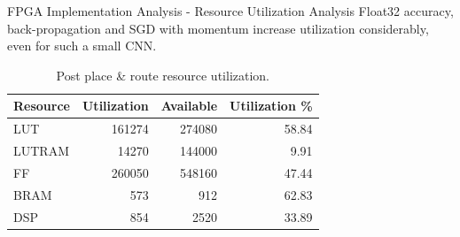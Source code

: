 \begin{frame}{FPGA Implementation Analysis - Resource Utilization Analysis}
    Float32 accuracy, back-propagation and SGD with momentum increase utilization considerably, even for such a small CNN.
    \begin{table}[H]
        \center
        \begin{tabular}
            { | l | r | r | r | }
            \hline
            Resource & Utilization & Available & Utilization \%\\
            \hline
            LUT      & 161274 & 274080 & 58.84\\
            LUTRAM   &  14270 & 144000 &  9.91\\
            FF       & 260050 & 548160 & 47.44\\
            BRAM     &    573 &    912 & 62.83\\
            DSP      &    854 &   2520 & 33.89\\
            \hline
        \end{tabular}
        \caption*{Post place \& route resource utilization.}
    \end{table}
\end{frame}